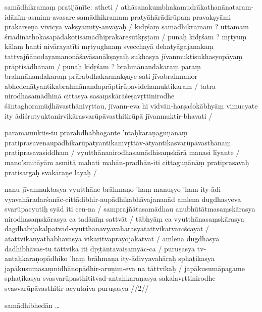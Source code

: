 \documentclass[12pt,parskip]{scrartcl}
\begin{document}
\begin{ekdosis}
  \begin{cjyo}[4.2]
    samādhikramaṃ pratijānīte: atheti /
    athāsanakumbhakamudrākathanānataram-idānīm-asminn-avasare samādhikramam pratyāhārādirūpaṃ pravakṣyāmi prakarṣeṇa vivicya vakṣyāmīty-anvayaḥ /
    kīdṛśaṃ samādhikramam ? uttamam śrīādināthokasapādakoṭisamādhiprakāreṣūtkṛṣṭam /
    punaḥ kīdṛśam ? mṛtyuṃ kālaṃ hanti nivārayatīti mṛtyughnaṃ svecchayā dehatyāgajanakaṃ tattvajñānodayamanonāśavāsanākṣayaiḥ sukhasya jīvanmuktisukhasyopāyaṃ prāptisādhanam /
    punaḥ kīdṛśam ? brahmānandakaraṃ paraṃ brahmānandakaraṃ prārabdhakarmakṣaye sati jīvabrahmaṇor-abhedenātyantikabrahmānandaprāptirūpavidehamuktikaram /
    tatra nirodhasamādhinā cittasya sasaṃskārāśeṣavṛttinirodhe śāntaghoramūḍhāvasthānivṛttau, jīvann-eva hi vidvān-harṣaśokābhyāṃ vimucyate ity ādiśrutyuktanirvikārasvarūpāvasthitirūpā jīvanmuktir-bhavati /

    paramamuktis-tu prārabdhabhogānte 'ntaḥkaraṇaguṇānāṃ pratiprasavenaupādhikarūpātyantikanivṛttāv-ātyantikasvarūpāvasthānaṃ pratiprasavasiddham /
    vyutthānanirodhasamādhisaṃskārā manasi līyante /
    mano'smitāyām asmitā mahati mahān-pradhān-iti cittaguṇānāṃ pratiprasavaḥ pratisargaḥ svakāraṇe layaḥ /

    nanu jīvanmuktasya vyutthāne brāhmaṇo 'haṃ manuṣyo 'ham ity-ādi vyavahāradarśanāc-cittādibhir-aupādhikabhāvajananād amlena dugdhasyeva svarūpacyutiḥ syād iti cen-na /
    samprajñātasamādhau anubhūtātmasaṃskārasya nirodhasaṃskārasya ca tadānīṃ sattvāt /
    tābhyāṃ ca vyutthānasaṃskārasya dagdhabījakalpatvād-vyutthānavyavahārasyātāttvikatvaniścayāt /
    atāttvikānyathābhāvasya vikāritvāprayojakatvāt /
    amlena dugdhasya dadhibhāvas-tu tāttvika iti dṛṣṭāntavaiṣamyāc-ca /
    puruṣasya tv-antaḥkaraṇopādhiko 'haṃ brāhmaṇa ity-ādivyavahāraḥ sphaṭikasya japākusumasaṃnidhānopādhir-aruṇim-eva na tāttvikaḥ /
    japākusumāpagame sphaṭikasya svasvarūpasthititvad-antaḥkaraṇasya sakalavṛttinirodhe svasvarūpāvasthitir-acyutaiva puruṣasya //2//
  \end{cjyo}

  \begin{cpra}[7.2]
    samādhibhedān …
  \end{cpra}

  \begin{tlg}[4.3][8.50]%
    \\
  \end{tlg}


\end{ekdosis}
\end{document}
